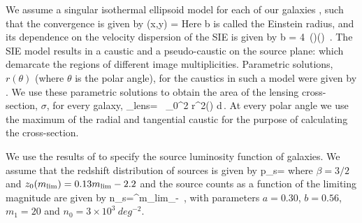 \documentclass[useAMS,usenatbib,a4paper]{mn2e}
\begin{document}

We assume a singular isothermal ellipsoid model for each of our galaxies
\citep{Kormann1994}, such that the convergence is given by
\be
\kappa (x,y) = 
\ee
Here b is called the Einstein radius, and its dependence on the velocity
dispersion of the SIE is given by
\be
b = 4\pi\,
\left(\right)\left(\right) \,.
\ee
The SIE model results in a caustic and a pseudo-caustic on the source plane:
which demarcate the regions of different image multiplicities. Parametric
solutions, $r(\theta)$ (where $\theta$ is the polar angle), for the caustics in
such a model were given by \citet{Keeton2000b}. We use these parametric
solutions to obtain the area of the lensing cross-section, $\sigma$, for every
galaxy,
\be
\sigma_{\rm lens}= \, \int_0^{2\pi} r^2(\theta) d\theta\,.
\ee
At every polar angle we use the maximum of the radial and tangential caustic for
the purpose of calculating the cross-section.





We use the results of \citet{Faure2009} to specify the source luminosity
function of galaxies. We assume that the redshift distribution of sources is
given by
\be
\label{eqn:ps}
p_s=
\ee
where $\beta=3/2$ and $z_0(m_{\rm lim})=0.13m_{\rm lim} - 2.2$ and the source
counts as a function of the limiting magnitude are given by
\be
\label{eqn:ns}
n_s=\int^{m_{\rm lim}}_{-\infty} 
\,,
\ee
with parameters $a=0.30$, $b=0.56$, $m_1=20$ and $n_0=3\times10^3~deg^{-2}$.
\end{document}
